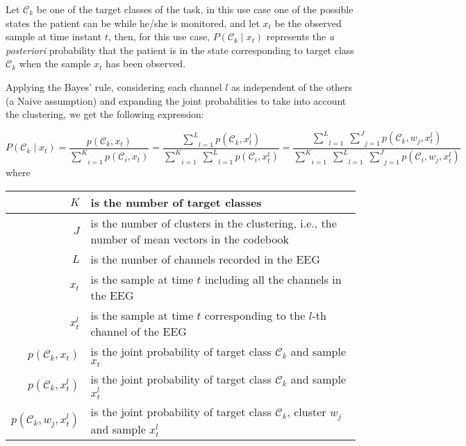 \documentclass[a4paper,12pt]{article}
\begin{document}
\pagestyle{empty}

Let $\mathcal{C}_{k}$ be one of the target classes of the task, in this use case
one of the possible states the patient can be while he/she is monitored,
and let $x_{t}$ be the observed sample at time instant $t$,
then, for this use case, $P(\mathcal{C}_{k} \mid x_{t})$ represents the
\emph{a posteriori} probability that the patient is in the state corresponding
to target class $\mathcal{C}_{k}$ when the sample $x_{t}$ has been observed.

\bigskip

Applying the Bayes' rule, considering each channel $l$ as independent of the others (a Naive assumption)
and expanding the joint probabilities to take into account the clustering, we get the following 
expression:

\[
    P(\mathcal{C}_{k} \mid x_{t}) = 
    \frac{p(\mathcal{C}_{k}, x_{t})}{\underset{i=1}{\overset{K}{\sum}} p(\mathcal{C}_{i}, x_{t})} =
    \frac{\underset{l=1}{\overset{L}{\sum}} p(\mathcal{C}_{k}, x_{t}^{l})}{\underset{i=1}{\overset{K}{\sum}} \; \underset{l=1}{\overset{L}{\sum}} p(\mathcal{C}_{i}, x_{t}^{l})} =
    \frac{\underset{l=1}{\overset{L}{\sum}} \; \underset{j=1}{\overset{J}{\sum}} p(\mathcal{C}_{k}, w_{j}, x_{t}^{l})}{\underset{i=1}{\overset{K}{\sum}} \; \underset{l=1}{\overset{L}{\sum}} \; \underset{j=1}{\overset{J}{\sum}} p(\mathcal{C}_{i}, w_{j}, x_{t}^{l})}
\]
where
\begin{center}
\begin{tabular}{|r|p{100mm}|}
\hline
$K$ & is the number of target classes \\
\hline
$J$ & is the number of clusters in the clustering, i.e., the number of mean vectors in the codebook \\
\hline
$L$ & is the number of channels recorded in the EEG \\
\hline
$x_{t}$ & is the sample at time $t$ including all the channels in the EEG \\
\hline
$x_{t}^{l}$ & is the sample at time $t$ corresponding to the $l$-th channel of the EEG \\
\hline
$p(\mathcal{C}_{k}, x_{t})$ & is the joint probability of target class $\mathcal{C}_{k}$ and sample $x_{t}$ \\
\hline
$p(\mathcal{C}_{k}, x_{t}^{l})$ & is the joint probability of target class $\mathcal{C}_{k}$ and sample $x_{t}^{l}$ \\
\hline
$p(\mathcal{C}_{k}, w_{j}, x_{t}^{l})$ & is the joint probability of target class $\mathcal{C}_{k}$, cluster $w_{j}$ and sample $x_{t}^{l}$ \\
\hline
\end{tabular}
\end{center}
\end{document}
